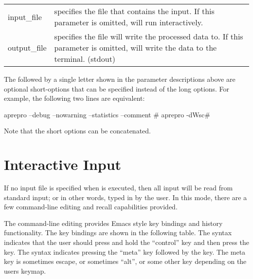 \begin{longtable}{lp{5.0in}}
input\_file &  specifies  the  file  that  contains  the \aprepro{} input. If this parameter is
omitted, \aprepro{} will run interactively. \\

output\_file &  specifies   the   file \aprepro{} will write the processed data to. If this
parameter is omitted, \aprepro{} will write the data to the terminal.   (stdout) \\
\end{longtable}

The \cmd{-} followed by a single letter shown in the parameter descriptions above are optional short-options
that can be specified instead of the long options. For example, the following 
two lines are equivalent:

\begin{apinp}
aprepro --debug --nowarning --statistics --comment \# 
aprepro -dWsc\#
\end{apinp}
Note that the short options can be concatenated.

\section{Interactive Input}

If no input file is specified when \aprepro{} is executed, then all
input will be read from standard input; or in other words, typed in by
the user.  In this mode, there are a few command-line editing and
recall capabilities provided.

The command-line editing provides Emacs style key bindings and
history functionality.  The key bindings are shown in the following
table. The syntax  indicates that the user should press and
hold the ``control'' key and then press the  key. The syntax
 indicates pressing the ``meta'' key followed by the 
key. The meta key is sometimes escape, or sometimes ``alt'', or some
other key depending on the users keymap.


